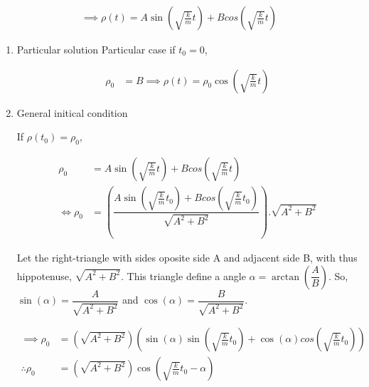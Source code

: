 \documentclass[12pt]{article}
\begin{document}
\begin{equation}
\begin{aligned}
 \implies \rho(t) = A \sin{\left(\sqrt{\frac{k}{m}}t\right)} + B cos{\left(\sqrt{\frac{k}{m}}t\right)}
\end{aligned}
\end{equation}
\begin{enumerate}
\item Particular solution
\label{sec:org4181458}
Particular case if \(t_0 = 0\),

\begin{equation}
\begin{aligned}
\rho_0 &= B
\implies \rho(t) = \rho_0 \cos{\left(\sqrt{\frac{k}{m}}t\right)}
\end{aligned}
\end{equation}

\item General initical condition
\label{sec:org9f21614}

If \(\rho(t_0)=\rho_0\),

\begin{equation}
\begin{aligned}
\rho_0 &= A \sin{\left(\sqrt{\frac{k}{m}}t\right)} + B cos{\left(\sqrt{\frac{k}{m}}t\right)} \\
\Leftrightarrow  \rho_0 &= \left(\dfrac{A \sin{\left(\sqrt{\frac{k}{m}}t_0\right)} + B cos{\left(\sqrt{\frac{k}{m}}t_0\right)}}{\sqrt{A^2 + B^2}}\right). \sqrt{A^2 + B^2}
\end{aligned}
\end{equation}

Let the right-triangle with sides oposite side A and adjacent side B, with thus hippotenuse, \(\sqrt{A^2 + B^2}\). This triangle define a angle \(\alpha = \arctan{(\dfrac{A}{B})}\). So, \(\sin{(\alpha)}= \dfrac{A}{\sqrt{A^2 + B^2}}\) and \(\cos{(\alpha)}= \dfrac{B}{\sqrt{A^2 + B^2}}\).

\begin{equation}
\begin{aligned}
\implies \rho_0 &= (\sqrt{A^2 + B^2})\left(\sin{(\alpha)} \sin{\left(\sqrt{\frac{k}{m}}t_0\right)} + \cos{(\alpha)} cos{\left(\sqrt{\frac{k}{m}}t_0\right)}\right)\\
\therefore \rho_0 &= (\sqrt{A^2 + B^2}) \cos{\left(\sqrt{\frac{k}{m}}t_0 - \alpha\right)}
\end{aligned}
\end{equation}
\end{enumerate}
\end{document}
